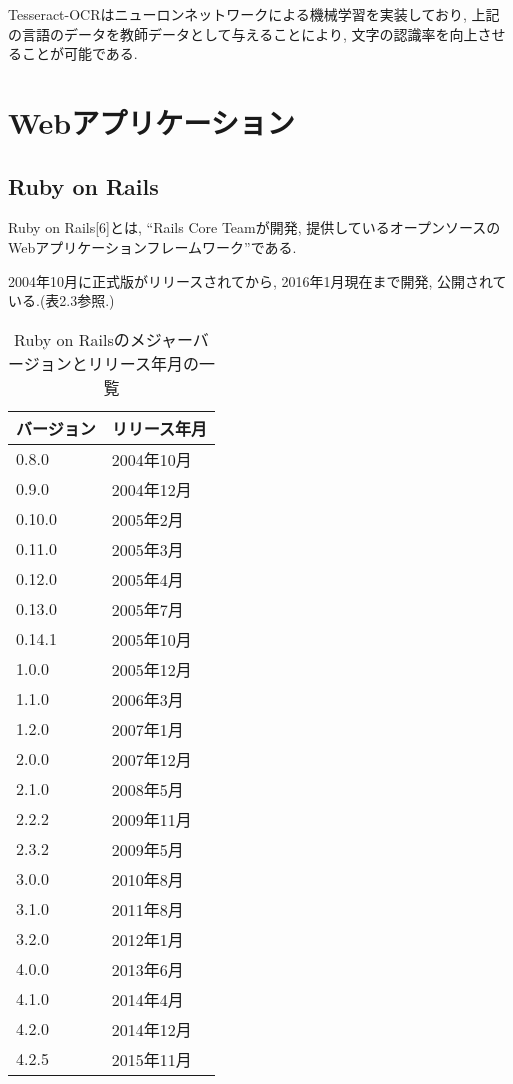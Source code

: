 Tesseract-OCRはニューロンネットワークによる機械学習を実装しており, 上記の言語のデータを教師データとして与えることにより, 文字の認識率を向上させることが可能である.

\section{Webアプリケーション}
\subsection{Ruby on Rails}
Ruby on Rails[6]とは, “Rails Core Teamが開発, 提供しているオープンソースのWebアプリケーションフレームワーク”である.

2004年10月に正式版がリリースされてから, 2016年1月現在まで開発, 公開されている.(表2.3参照.)

\begin{table}[htb]
\begin{center}
\begin{tabular}{|l|l|} \hline
バージョン & リリース年月 \\ \hline \hline
0.8.0 & 2004年10月 \\ \hline
0.9.0 & 2004年12月 \\ \hline
0.10.0 & 2005年2月 \\ \hline
0.11.0 & 2005年3月 \\ \hline
0.12.0 & 2005年4月 \\ \hline
0.13.0 & 2005年7月 \\ \hline
0.14.1 & 2005年10月 \\ \hline
1.0.0 & 2005年12月 \\ \hline
1.1.0 & 2006年3月 \\ \hline
1.2.0 & 2007年1月 \\ \hline
2.0.0 & 2007年12月 \\ \hline
2.1.0 & 2008年5月 \\ \hline
2.2.2 & 2009年11月 \\ \hline
2.3.2 & 2009年5月 \\ \hline
3.0.0 & 2010年8月 \\ \hline
3.1.0 & 2011年8月 \\ \hline
3.2.0 & 2012年1月 \\ \hline
4.0.0 & 2013年6月 \\ \hline
4.1.0 & 2014年4月 \\ \hline
4.2.0 & 2014年12月 \\ \hline
4.2.5 & 2015年11月 \\ \hline
\end{tabular}
\caption{Ruby on Railsのメジャーバージョンとリリース年月の一覧}
\end{center}
\end{table}

